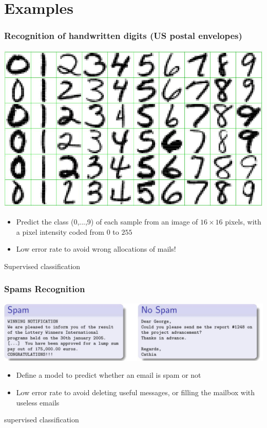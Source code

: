 \documentclass[pressentation,9pt,aspectratio=1610,xcolor=table]{beamer}
\newcommand{\doigt}{\noindent \Pisymbol{pzd}{43}}
\begin{document}
\section{Examples}
\begin{frame}
  \frametitle{Recognition of handwritten digits (US postal envelopes)}
    \begin{center}
      \includegraphics[width=.5\textwidth]{ex_handwriten.jpg}
    \end{center}
    \begin{itemize}
    \item[\doigt] Predict the class (0,...,9) of each sample from an image of
      $16\times 16$ pixels, with a pixel intensity coded from $0$ to $255$
    \item Low error rate to avoid wrong allocations of mails!
    \end{itemize}
    \begin{center}
      \alert{Supervised classification }
    \end{center}
\end{frame}

\begin{frame}
  \frametitle{Spams Recognition}
    \begin{center}
      \includegraphics[width=.8\textwidth]{ex_spams.jpg}
    \end{center}
    \begin{itemize}
    \item[\doigt]
      Define a model to predict whether an email is spam or not
    \item Low error rate to avoid deleting useful messages, or filling the mailbox with useless emails
    \end{itemize}
  \begin{center}
    \alert{supervised classification}
  \end{center}

\end{frame}
\end{document}
